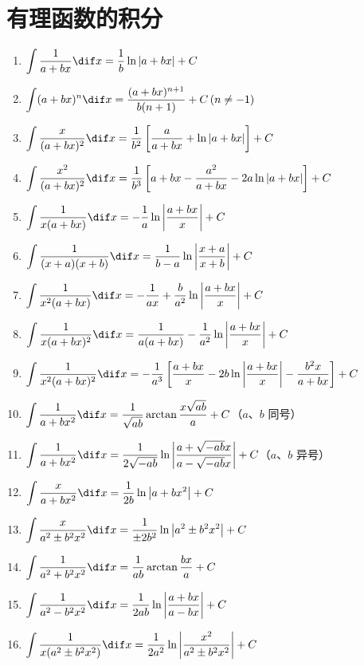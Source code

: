 \section*{有理函数的积分}
\begin{enumerate}[1.,itemsep=5pt,resume]
  \item $\displaystyle \int \frac{1}{a+bx}\dif x=\frac{1}{b}\ln|a+bx|+C$
  \item $\displaystyle \int (a+bx)^n\dif x=\frac{(a+bx)^{n+1}}{b(n+1)}+C\,(n\neq -1)$
  \item $\displaystyle \int \frac{x}{(a+bx)^2}\dif x=\frac{1}{b^2}\left[ \frac{a}{a+bx}+ \ln|a+bx|\right]+C$
  \item $\displaystyle \int \frac{x^2}{(a+bx)^2}\dif x=\frac{1}{b^3}\left[ a+bx-\frac{a^2}{a+bx}-2a\ln|a+bx|\right]+C$
  \item $\displaystyle \int \frac{1}{x(a+bx)}\dif x=-\frac{1}{a}\ln\left|\frac{a+bx}{x}\right|+C$
  \item $\displaystyle \int \frac{1}{(x+a)(x+b)}\dif x=\frac{1}{b-a}\ln\left|\frac{x+a}{x+b}\right|+C$
  \item $\displaystyle \int \frac{1}{x^2(a+bx)}\dif x=-\frac{1}{ax}+\frac{b}{a^2}\ln\left|\frac{a+bx}{x}\right|+C$
  \item $\displaystyle \int \frac{1}{x(a+bx)^2}\dif x=\frac{1}{a(a+bx)}-\frac{1}{a^2}\ln\left|\frac{a+bx}{x}\right|+C$
  \item $\displaystyle \int \frac{1}{x^2(a+bx)^2}\dif x=-\frac{1}{a^3}\left[\frac{a+bx}{x}-2b\ln\left|\frac{a+bx}{x}\right|-\frac{b^2x}{a+bx}\right]+C$
  \item $\displaystyle \int \frac{1}{a+bx^2}\dif x =\frac{1}{\sqrt{ab}}\arctan\frac{x\sqrt{ab}}{a} +C$（$a$、$b$ 同号）
  \item $\displaystyle \int \frac{1}{a+bx^2}\dif x =\frac{1}{2\sqrt{-ab}}\ln\left|\frac{a+\sqrt{-ab}x}{a-\sqrt{-ab}x}\right|+C$（$a$、$b$ 异号）
  \item $\displaystyle \int \frac{x}{a+bx^2}\dif x =\frac{1}{2b}\ln\left|a+bx^2\right|+C$
  \item $\displaystyle \int \frac{x}{a^2\pm b^2x^2}\dif x =\frac{1}{\pm 2b^2}\ln\left|a^2\pm b^2x^2\right|+C$
  \item $\displaystyle \int \frac{1}{a^2+b^2x^2}\dif x =\frac{1}{ab}\arctan\frac{bx}{a}+C$
  \item $\displaystyle \int \frac{1}{a^2-b^2x^2}\dif x =\frac{1}{2ab}\ln\left|\frac{a+bx}{a-bx}\right|+C$
  \item $\displaystyle \int \frac{1}{x(a^2\pm b^2x^2)}\dif x =\frac{1}{2a^2}\ln\left|\frac{x^2}{a^2\pm b^2x^2}\right|+C$

\end{enumerate}
